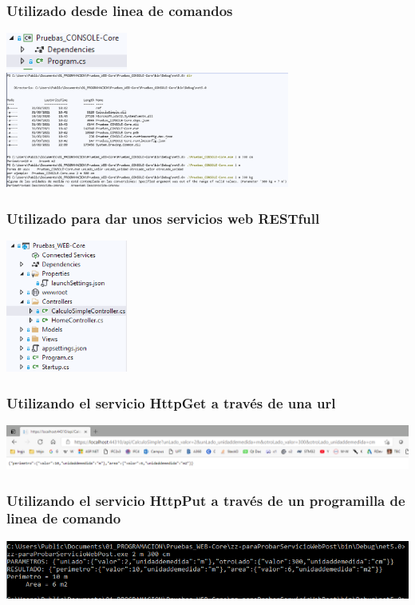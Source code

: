 \documentclass[spanish,12pt,a4paper,final,oneside]{book}
\begin{document}
\subsubsection{Utilizado desde linea de comandos}
\includegraphics[width=0.3\textwidth]{Consola_codigo.png} 
\includegraphics[width=0.7\textwidth]{Consola_pantallazo.png} 


\subsubsection{Utilizado para dar unos servicios web RESTfull}
\includegraphics[width=0.3\textwidth]{ServiciosREST_codigo.png} 


\subsubsection{Utilizando el servicio HttpGet a través de una url}
\includegraphics[width=\textwidth]{HttpGet_pantallazo.png} 

\subsubsection{Utilizando el servicio HttpPut a través de un programilla de linea de comando}
\includegraphics[width=\textwidth]{HttpPut_pantallazo.png} 

\end{document}

